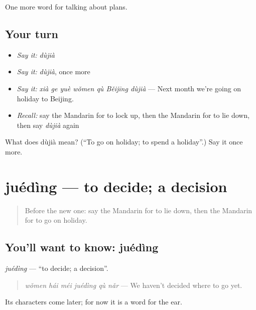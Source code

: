 \begin{grammarlens}[title={What you've built}]
One more word for talking about plans.
\end{grammarlens}

\subsection*{Your turn}
\begin{itemize}
\raggedright
  \item \emph{Say it:} \emph{dùjià}
  \item \emph{Say it:} \emph{dùjià}, once more
  \item \emph{Say it:} \emph{xià ge yuè wǒmen qù Běijīng dùjià} — Next month we're going on holiday to Beijing.
  \item \emph{Recall:} say the Mandarin for to lock up, then the Mandarin for to lie down, then say \emph{dùjià} again
\end{itemize}

\begin{tcolorbox}[breakable,colback=teal!4,colframe=teal!35!black,title={Before you move on}]
What does dùjià mean? (\textquotedblleft{}To go on holiday; to spend a holiday\textquotedblright{}.) Say it once more.
\end{tcolorbox}
\section[juédìng]{juédìng — to decide; a decision}

\label{lesson:ZH-C184-jueding}



\begin{quote}
Before the new one: say the Mandarin for to lie down, then the Mandarin for to go on holiday.
\end{quote}

\subsection*{You'll want to know: juédìng}
\emph{juédìng} — \textquotedblleft{}to decide; a decision\textquotedblright{}.

\begin{quote}
\emph{wǒmen hái méi juédìng qù nǎr} — We haven't decided where to go yet.
\end{quote}

Its characters come later; for now it is a word for the ear.

